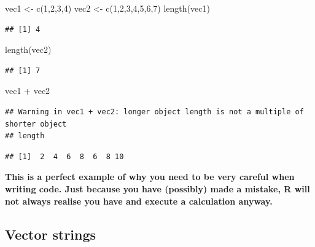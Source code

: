 \documentclass[
]{book}
\newenvironment{Shaded}{\begin{snugshade}}{\end{snugshade}}
\newcommand{\DecValTok}[1]{\textcolor[rgb]{0.00,0.00,0.81}{#1}}
\newcommand{\FunctionTok}[1]{\textcolor[rgb]{0.00,0.00,0.00}{#1}}
\newcommand{\NormalTok}[1]{#1}
\newcommand{\OtherTok}[1]{\textcolor[rgb]{0.56,0.35,0.01}{#1}}
\newcommand{\SpecialCharTok}[1]{\textcolor[rgb]{0.00,0.00,0.00}{#1}}
\theoremstyle{definition}
\theoremstyle{definition}
\theoremstyle{definition}
\theoremstyle{definition}
\theoremstyle{remark}
\begin{document}
\begin{Shaded}
\begin{Highlighting}[]
\NormalTok{vec1 }\OtherTok{\textless{}{-}} \FunctionTok{c}\NormalTok{(}\DecValTok{1}\NormalTok{,}\DecValTok{2}\NormalTok{,}\DecValTok{3}\NormalTok{,}\DecValTok{4}\NormalTok{)}
\NormalTok{vec2 }\OtherTok{\textless{}{-}} \FunctionTok{c}\NormalTok{(}\DecValTok{1}\NormalTok{,}\DecValTok{2}\NormalTok{,}\DecValTok{3}\NormalTok{,}\DecValTok{4}\NormalTok{,}\DecValTok{5}\NormalTok{,}\DecValTok{6}\NormalTok{,}\DecValTok{7}\NormalTok{)}
\FunctionTok{length}\NormalTok{(vec1)}
\end{Highlighting}
\end{Shaded}

\begin{verbatim}
## [1] 4
\end{verbatim}

\begin{Shaded}
\begin{Highlighting}[]
\FunctionTok{length}\NormalTok{(vec2)}
\end{Highlighting}
\end{Shaded}

\begin{verbatim}
## [1] 7
\end{verbatim}

\begin{Shaded}
\begin{Highlighting}[]
\NormalTok{vec1 }\SpecialCharTok{+}\NormalTok{ vec2}
\end{Highlighting}
\end{Shaded}

\begin{verbatim}
## Warning in vec1 + vec2: longer object length is not a multiple of shorter object
## length
\end{verbatim}

\begin{verbatim}
## [1]  2  4  6  8  6  8 10
\end{verbatim}

\textbf{This is a perfect example of why you need to be very careful when writing code. Just because you have (possibly) made a mistake, R will not always realise you have and execute a calculation anyway.}

\hypertarget{vector-strings}{%
\subsection{Vector strings}\label{vector-strings}}
\end{document}
